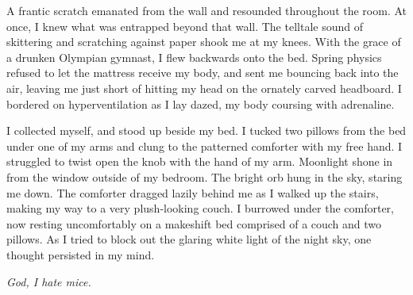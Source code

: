 \documentclass[12pt]{article}
\begin{document}
A frantic scratch emanated from the wall and resounded throughout the room.  At once, I knew what was entrapped beyond that wall.  The telltale sound of skittering and scratching against paper shook me at my knees.  With the grace of a drunken Olympian gymnast, I flew backwards onto the bed.  Spring physics refused to let the mattress receive my body, and sent me bouncing back into the air, leaving me just short of hitting my head on the ornately carved headboard.  I bordered on hyperventilation as I lay dazed, my body coursing with adrenaline.

I collected myself, and stood up beside my bed.  I tucked two pillows from the bed under one of my arms and clung to the patterned comforter with my free hand.  I struggled to twist open the knob with the hand of my arm.  Moonlight shone in from the window outside of my bedroom.  The bright orb hung in the sky, staring me down.  The comforter dragged lazily behind me as I walked up the stairs, making my way to a very plush-looking couch.  I burrowed under the comforter, now resting uncomfortably on a makeshift bed comprised of a couch and two pillows.  As I tried to block out the glaring white light of the night sky, one thought persisted in my mind.

\textit{God, I hate mice.}
\end{document}
